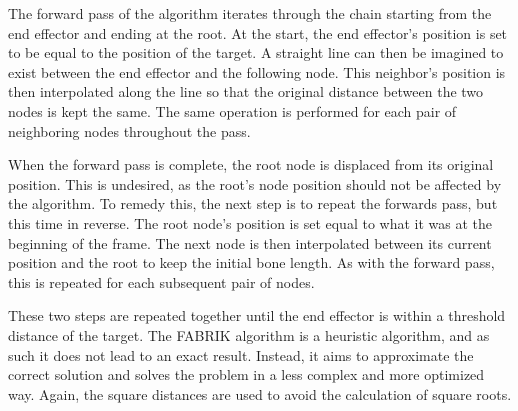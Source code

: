 The forward pass of the algorithm iterates through the chain starting from the
end effector and ending at the root. At the start, the end effector's position
is set to be equal to the position of the target. A straight line can then be
imagined to exist between the end effector and the following node. This
neighbor's position is then interpolated along the line so that the original
distance between the two nodes is kept the same. The same operation is performed
for each pair of neighboring nodes throughout the pass. 


When the forward pass is complete, the root node is displaced from its original
position. This is undesired, as the root's node position should not be affected
by the algorithm. To remedy this, the next step is to repeat the forwards pass,
but this time in reverse. The root node's position is set equal to what it was
at the beginning of the frame. The next node is then interpolated between its
current position and the root to keep the initial bone length. As with the
forward pass, this is repeated for each subsequent pair of nodes. 


These two steps are repeated together until the end effector is within
a threshold distance of the target. The FABRIK algorithm is a heuristic
algorithm, and as such it does not lead to an exact result. Instead, it aims to
approximate the correct solution and solves the problem in a less complex and
more optimized way. Again, the square distances are used to avoid the
calculation of square roots. 

